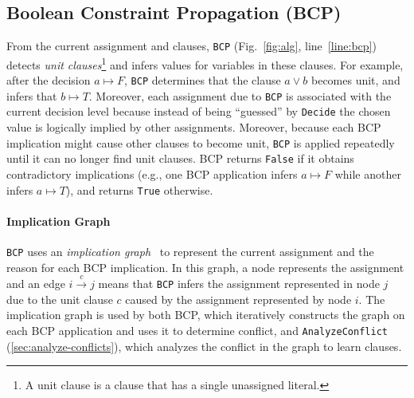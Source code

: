 \documentclass[oneside,11pt,dvipsnames]{book}
\numberwithin{equation}{section}
\theoremstyle{definition}
\theoremstyle{remark}
\newcommand{\tool}{\texttt{NeuralSAT}}
\begin{document}





\subsection{Boolean Constraint Propagation (BCP)}\label{sec:bcp}

From the current assignment and clauses, \texttt{BCP} (Fig.~\ref{fig:alg}, line~\ref{line:bcp}) detects \emph{unit clauses}\footnote{A unit clause is a clause that has a single unassigned literal.} and infers values for variables in these clauses.
For example, after the decision $a\mapsto F$, \texttt{BCP} determines that the clause $a\vee b$ becomes unit, and infers that $b \mapsto T$.
Moreover, each assignment due to \texttt{BCP} is associated with the current decision level because instead of being ``guessed'' by \texttt{Decide} the chosen value is logically implied by other assignments.
Moreover, because each {BCP} implication might cause other clauses to become unit, \texttt{BCP} is applied repeatedly until it can no longer find unit clauses.
\textsc{BCP} returns \texttt{False} if it obtains contradictory implications (e.g., one BCP application infers $a \mapsto F$ while another infers $a \mapsto T$), and returns \texttt{True} otherwise.

\paragraph{Implication Graph} \texttt{BCP} uses an \emph{implication graph}~\cite{barrett2013decision} to represent the current assignment and the reason for each BCP implication. In this graph, a node represents the assignment and an edge $i \xrightarrow{c} j$ means that \texttt{BCP} infers the assignment represented in node $j$ due to the unit clause $c$ caused by the assignment represented by node $i$.
The implication graph is used by both BCP, which iteratively constructs the graph on each BCP application and uses it to determine conflict, and \texttt{AnalyzeConflict} (\autoref{sec:analyze-conflicts}), which analyzes the conflict in the graph to learn clauses.
\end{document}
